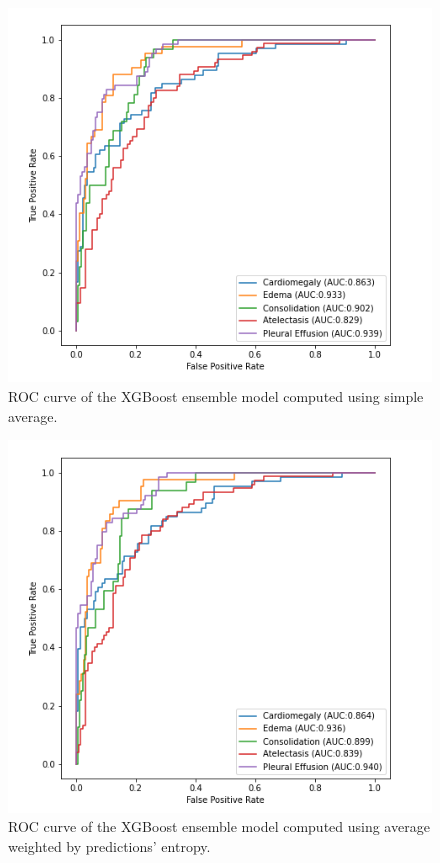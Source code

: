 \begin{figure}[htbp!]
    \centering
    \includegraphics[scale=0.55]{Tesi/images/Results/xgb_average.png}
    \caption[ROC curve for XGBoost simple average ensemble]{ROC curve of the XGBoost ensemble model computed using simple average.}
    \label{fig:figure_5.11}
\end{figure}

\newpage

\begin{figure}[t!]
    \centering
    \includegraphics[scale=0.55]{Tesi/images/Results/xgb_average_entropy.png}
    \caption[ROC curve for XGBoost weighted average ensemble]{ROC curve of the XGBoost ensemble model computed using average weighted by predictions' entropy.}
    \label{fig:figure_5.12}
\end{figure}

